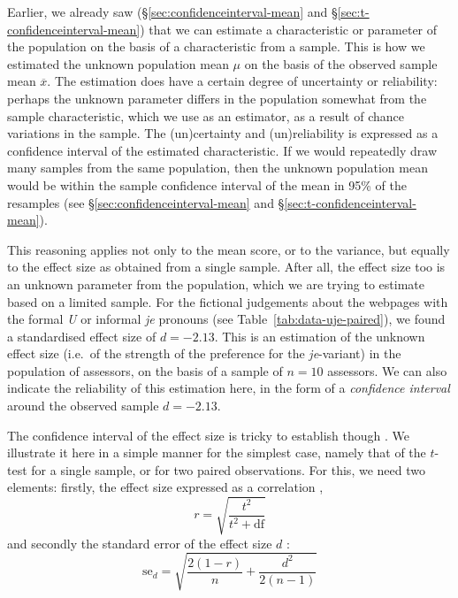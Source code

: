 \documentclass[
]{book}
\begin{document}
Earlier, we already saw
(§\ref{sec:confidenceinterval-mean} and
§\ref{sec:t-confidenceinterval-mean})
that we can estimate a characteristic
or parameter of the population on the basis of a characteristic
from a sample. This is how we estimated the unknown population mean \(\mu\)
on the basis of the observed sample mean
\(\overline{x}\). The estimation does have a certain degree of
uncertainty or reliability: perhaps the unknown parameter differs
in the population somewhat from the sample characteristic,
which we use as an estimator, as a result of chance variations in the
sample. The (un)certainty and (un)reliability is expressed as
a confidence interval of the estimated characteristic.
If we would repeatedly draw many samples from the same population, then the unknown population mean would be within the sample confidence interval of the mean in 95\% of the resamples
(see §\ref{sec:confidenceinterval-mean} and §\ref{sec:t-confidenceinterval-mean}).

This reasoning applies not only to the mean score, or to the
variance, but equally to the effect size as obtained from a single sample.
After all, the effect size too is
an unknown parameter from the population, which we are trying to estimate
based on a limited sample. For the fictional judgements
about the webpages with the formal \emph{U} or informal \emph{je} pronouns (see
Table~\ref{tab:data-uje-paired}), we found a standardised effect size
of \(d=-2.13\). This is an estimation of the unknown
effect size (i.e.~of the strength of the preference for the \emph{je}-variant)
in the population of assessors, on the basis of a sample of \(n=10\)
assessors. We can also indicate the reliability of this estimation
here, in the form of a \emph{confidence interval} around the
observed sample \(d=-2.13\).

The confidence interval of the effect size is tricky to establish though
\citep{Naka07, Chen15}. We illustrate it here in a simple manner for
the simplest case, namely that of the \(t\)-test for a single sample,
or for two paired observations. For this, we need two elements:
firstly, the effect size expressed as a correlation \citep[ p.359, formula 12.1]{Rose08}, \[r = \sqrt{ \frac{t^2}{t^2+\textrm{df}} }\] and secondly
the standard error of the effect size \(d\) \citep[ p.600,
formula 18]{Naka07}:\\
\begin{equation}
  \label{eq:d-paired-se}
    \textrm{se}_d = \sqrt{ \frac{2(1-r)}{n} + \frac{d^2}{2(n-1)} }
\end{equation}
\end{document}
